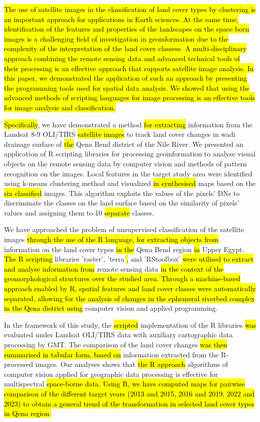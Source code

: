 \documentclass[information,article,submit,pdftex,moreauthors]{Definitions/mdpi}
\begin{document}
\hl{The use of satellite images in the classification of land cover types by clustering is an important approach for applications in Earth sciences. At the same time, identification of the features and properties of the landscapes on the space born images is a challenging field of investigation in geoinformation due to the complexity of the interpretation of the land cover classess. A multi-disciplinary approach combining the remote sensing data and advanced technical tools of their processing is an effective approach that supports satellite image analysis. In this paper, we demonstrated the application of such an approach by presenting the programming tools used for spatial data analysis. We showed that using the advanced methods of scripting languages for image processing is an effective tools for image analysis and classification.}

\hl{Specifically}, we have demonstrated a method \hl{for extracting }information from the Landsat 8-9 OLI/TIRS \hl{satellite images }to track land cover changes in wadi drainage surface of \hl{the }Qena Bend district of the Nile River. We presented an application of R scripting libraries for processing geoinformation to analyse visual objects on the remote sensing data by computer vision and methods of pattern recognition on the images. Local features in the target study area were identified using k-means clustering method and visualized \hl{in synthesised }maps based on the \hl{six classified }images. This algorithm exploits the values of the pixels' DNs to discriminate the classes on the land surface based on the similarity of pixels' values and assigning them to 10 \hl{separate }classes. 

We have approached the problem of unsupervised classification of the satellite images \hl{through the use of the R language, for extracting objects from }information on the land cover types \hl{in the }Qena Bend region \hl{in }Upper Egypt. \hl{The R scripting }libraries 'raster', 'terra'\hl{, }and 'RStoolbox' \hl{were utilised to extract and analyse information from }remote sensing data \hl{in the context of the geomorphological structures over the studied area. Through a machine-based approach enabled by R, spatial features and land cover classes were automatically separated, allowing for the analysis of changes in the ephemeral riverbed complex in the Qena district using }computer vision and applied programming.

In the framework of this study, the \hl{scripted }implementation of the R libraries \hl{was }evaluated under Landsat OLI/TIRS data with auxiliary cartographic data processing by GMT. The comparison of the land cover changes \hl{was then summarised in tabular form, based on }information extracted from the R-processed images. Our analyses shows that \hl{the R approach }algorithms of computer vision applied for geographic data processing is effective for multispectral \hl{space-borne data. Using R, we have computed maps for pairwise comparison of the different target years (2013 and 2015, 2016 and 2019, 2022 and 2023) to obtain a general trend of the transformation in selected land cover types in Qena region.}
\end{document}
